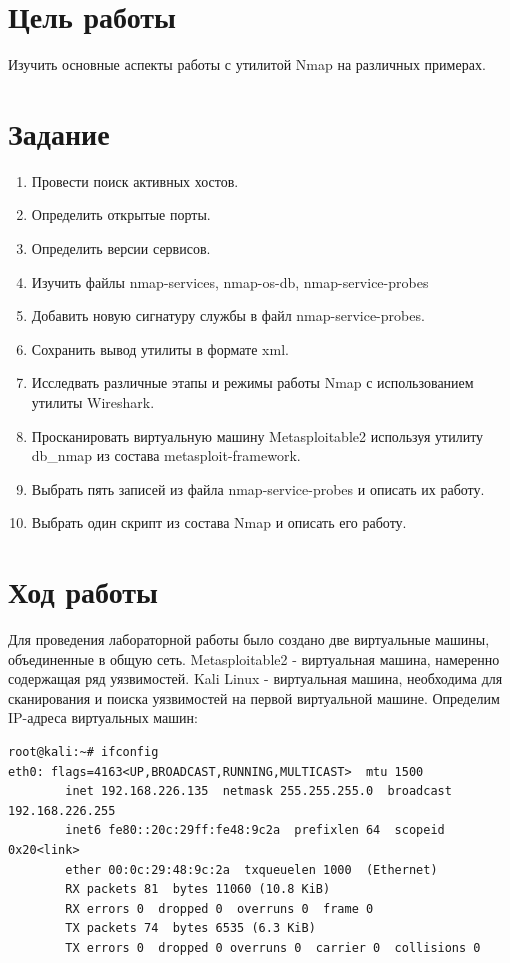 \documentclass[10pt,a4paper,titlepage]{article}
\begin{document}
\tableofcontents
\newpage

\section{Цель работы}
Изучить основные аспекты работы с утилитой Nmap на различных примерах.

\section{Задание}
\begin{enumerate}
	\item Провести поиск активных хостов.
    \item Определить открытые порты.
    \item Определить версии сервисов.
    \item Изучить файлы nmap-services, nmap-os-db, nmap-service-probes
    \item Добавить новую сигнатуру службы в файл nmap-service-probes.
    \item Сохранить вывод утилиты в формате xml.
    \item Исследвать различные этапы и режимы работы Nmap с использованием утилиты Wireshark.
    \item Просканировать виртуальную машину Metasploitable2 используя утилиту db\_nmap из состава metasploit-framework.
    \item Выбрать пять записей из файла nmap-service-probes и описать их работу.
    \item Выбрать один скрипт из состава Nmap и описать его работу.
\end{enumerate}

\section{Ход работы}
Для проведения лабораторной работы было создано две виртуальные машины, объединенные в общую  сеть. Metasploitable2 - виртуальная машина, намеренно содержащая ряд уязвимостей. Kali Linux - виртуальная машина, необходима для сканирования и поиска уязвимостей на первой виртуальной машине. Определим IP-адреса виртуальных машин:

\begin{verbatim}
root@kali:~# ifconfig
eth0: flags=4163<UP,BROADCAST,RUNNING,MULTICAST>  mtu 1500
        inet 192.168.226.135  netmask 255.255.255.0  broadcast 192.168.226.255
        inet6 fe80::20c:29ff:fe48:9c2a  prefixlen 64  scopeid 0x20<link>
        ether 00:0c:29:48:9c:2a  txqueuelen 1000  (Ethernet)
        RX packets 81  bytes 11060 (10.8 KiB)
        RX errors 0  dropped 0  overruns 0  frame 0
        TX packets 74  bytes 6535 (6.3 KiB)
        TX errors 0  dropped 0 overruns 0  carrier 0  collisions 0

\end{verbatim}
\end{document}
